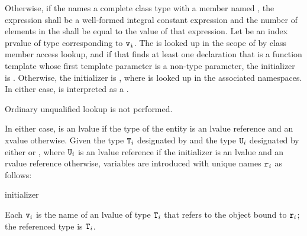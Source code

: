 \pnum
Otherwise, if
the  
names a complete class type with a member named ,
the expression 
shall be a well-formed integral constant expression
and
the number of elements in
the  shall be equal to the value of that
expression.
Let  be an index prvalue of type 
corresponding to $\texttt{v}_{\texttt{i}}$.
The   is looked up
in the scope of  by class member access lookup,
and if that finds at least one declaration
that is a function template whose first template parameter
is a non-type parameter,
the initializer is
. Otherwise, the initializer is ,
where  is looked up in the associated namespaces.
In either case,  is interpreted as a .
\begin{note}
Ordinary unqualified lookup is not performed.
\end{note}
In either case,  is an lvalue if the type of the entity 
is an lvalue reference and an xvalue otherwise.
Given the type $\texttt{T}_i$ designated by
 and
the type $\texttt{U}_i$ designated by
either  or ,
where $\texttt{U}_i$ is an lvalue reference if
the initializer is an lvalue and an rvalue reference otherwise,
variables are introduced with unique names $\texttt{r}_i$ as follows:

\begin{ncbnf}
  initializer \terminal{;}
\end{ncbnf}

Each $\texttt{v}_i$ is the name of an lvalue of type $\texttt{T}_i$
that refers to the object bound to $\texttt{r}_i$;
the referenced type is $\texttt{T}_i$.

